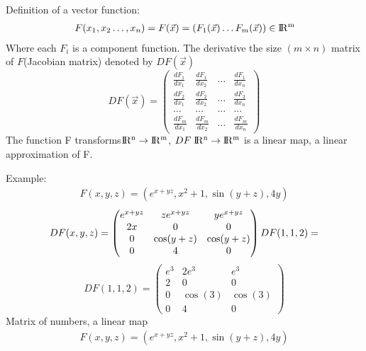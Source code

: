 \documentclass{article}
\newcommand{\R}{\rm I\!R}
\begin{document}
        Definition of a vector function:
        \begin{align}
            F(x_1,x_2\dots,x_n) = F(\vec{x}) = (F_1(\vec{x})\dots F_m(\vec{x}))\in \R^m
        \end{align}
        Where each $F_i$ is a component function. The derivative the size $(m \times n)$ matrix of $F$(Jacobian matrix) denoted by $DF(\vec{x})$
        \begin{equation}
            DF(\vec{x}) = 
            \begin{pmatrix}
                \frac{dF_1}{dx_1} & \frac{dF_1}{dx_2} & \dots & \frac{dF_1}{dx_n}\\
                \frac{dF_2}{dx_1} & \frac{dF_2}{dx_2} & \dots & \frac{dF_2}{dx_n}\\
                \dots&\dots&\dots&\dots\\
                \frac{dF_m}{dx_1} & \frac{dF_m}{dx_2} & \dots & \frac{dF_m}{dx_n}
            \end{pmatrix}
        \end{equation}
        The function F transforms$\R^n\rightarrow\R^m$, $DF\;\R^n\rightarrow\R^m$ is a linear map, a linear approximation of F.
        
        Example:
        \begin{align}
            F(x,y,z) = (e^{x+yz},x^2+1,\sin{(y+z)},4y)
        \end{align}
        \begin{equation}
            DF(x,y,z) = 
            \begin{pmatrix}
                e^{x+yz} & ze^{x+yz} & ye^{x+yz}\\
                2x       & 0         & 0\\
                0        & \cos(y+z) & \cos(y+z)\\
                0        & 4         & 0
            \end{pmatrix}\\
            DF(1,1,2) = 
        \end{equation}
        \begin{equation}
            DF(1,1,2) = 
            \begin{pmatrix}
                e^{3} & 2e^{3} & e^{3}\\
                2     & 0      & 0\\
                0     & \cos(3)& \cos(3)\\
                0     & 4      & 0
            \end{pmatrix}
        \end{equation}
        Matrix of numbers, a linear map
        \begin{align}
            F(x,y,z) = (e^{x+yz},x^2+1,\sin{(y+z)},4y)
        \end{align}
\end{document}

